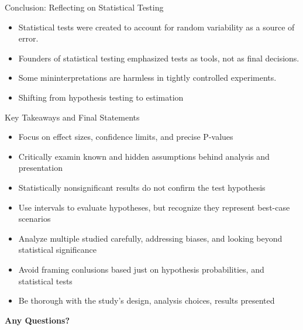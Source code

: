 \documentclass[aspectratio=169, 12pt]{beamer}
\begin{document}
\begin{frame}{Conclusion: Reflecting on Statistical Testing}
\begin{itemize}
    \item Statistical tests were created to account for random variability as a source of error.
    \vspace{0.5cm}
    \item Founders of statistical testing emphasized tests as tools, not as final decisions.
    \vspace{0.5cm}
    \item Some mininterpretations are harmless in tightly controlled experiments.
    \vspace{0.5cm}
    \item Shifting from hypothesis testing to estimation
\end{itemize}
\end{frame}

\begin{frame}{Key Takeaways and Final Statements}
\begin{itemize}
    \item Focus on effect sizes, confidence limits, and precise P-values
    \item Critically examin known and hidden assumptions behind analysis and presentation
    \item Statistically nonsignificant results do not confirm the test hypothesis
    \item Use intervals to evaluate hypotheses, but recognize they represent best-case scenarios
    \item Analyze multiple studied carefully, addressing biases, and looking beyond statistical significance
    \item Avoid framing conlusions based just on hypothesis probabilities, and statistical tests
    \item Be thorough with the study's design, analysis choices, results presented
\end{itemize}
\end{frame}

\begin{frame}[plain]
    \begin{center}
        {\Huge \textbf{\textcolor{structure}{Any Questions?}}}
    \end{center}
\end{frame}
\end{document}
